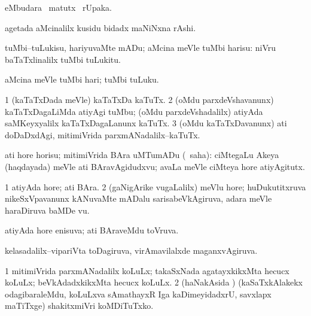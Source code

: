 \bentry
{}
\gl{\kirx}
\bmng
{} eMbudara \BU\ matutx \BUkaq\ rUpaka. 
\emng
\eentry

\bentry
{}
\gl{\nA}
\bmng
agetada aMcinalilx kusidu bidadx maNiNxna rAshi. 
\emng
\eentry

\bentry
{}
\gl{\kirx}
\bmng
\emng

\noindent
\gl{\sakirx}
\bmng
tuMbi--tuLukisu, hariyuvaMte mADu; aMcina meVle tuMbi harisu:  niVru baTaTxlinalilx tuMbi tuLukitu. 
\emng

\noindent
\gl{\akirx}
\bmng
aMcina meVle tuMbi hari; tuMbi tuLuku. 
\emng
\eentry

\bentry
{}
\gl{\sakirx}
\bmng
\bnum
\num{1} (kaTaTxDada meVle) kaTaTxDa kaTuTx. 
\num{2} (oMdu parxdeVshavanunx) kaTaTxDagaLiMda atiyAgi tuMbu; (oMdu parxdeVshadalilx) atiyAda saMKeyxyalilx kaTaTxDagaLanunx kaTuTx. 
\num{3} (oMdu kaTaTxDavanunx) ati doDaDxdAgi, mitimiVrida parxmANadalilx--kaTuTx. 
\enum
\emng
\eentry

\bentry
{}
\gl{\sakirx}
\bmng
ati hore horisu; mitimiVrida BAra uMTumADu (\rUpa\ saha):  ciMtegaLu Akeya (haqdayada) meVle ati BAravAgidudxvu; avaLa meVle ciMteya hore atiyAgitutx. 
\emng
\eentry

\bentry
{}
\gl{\nA}
\bmng
\bnum
\num{1} atiyAda hore; ati BAra. 
\num{2} (gaNigArike \mo vugaLalilx) meVlu hore; huDukutitxruva nikeSxVpavanunx kANuvaMte mADalu sarisabeVkAgiruva, adara meVle haraDiruva baMDe \mo vu. 
\enum
\emng
\eentry

\bentry
{}
\gl{\gu}
\bmng
atiyAda hore enisuva; ati BAraveMdu toVruva. 
\emng
\eentry

\bentry
{}
\gl{\sakirx}
\bmng
kelasadalilx--vipariVta toDagiruva, virAmavilalxde maganxvAgiruva. 
\emng
\eentry

\bentry
{}
\gl{\sakirx}
\bmng
\bnum
\num{1} mitimiVrida parxmANadalilx koLuLx; takaSxNada agatayxkikxMta hecucx koLuLx; beVkAdadxkikxMta hecucx koLuLx. 
\num{2} (haNakAsida \vi) (kaSaTxkAlakekx odagibaraleMdu, koLuLxva sAmathayxR Iga kaDimeyidadxrU, savxlapx maTiTxge) shakitxmiVri koMDiTuTxko. 
\enum
\emng

